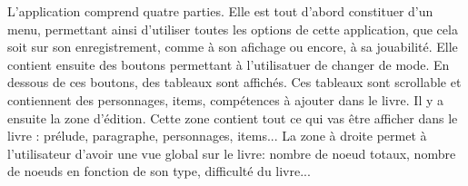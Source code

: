 		L'application comprend quatre parties. Elle est tout d'abord constituer d'un menu, permettant ainsi d'utiliser toutes les options de cette application, que cela soit sur son enregistrement, comme à son afichage ou encore, à sa jouabilité.
		Elle contient ensuite des boutons permettant à l'utilisatuer de changer de mode. En dessous de ces boutons, des tableaux sont affichés. Ces tableaux sont scrollable et contiennent des personnages, items, compétences à ajouter dans le livre.
		Il y a ensuite la zone d'édition. Cette zone contient tout ce qui vas être afficher dans le livre : prélude, paragraphe, personnages, items...
		La zone à droite permet à l'utilisateur d'avoir une vue global sur le livre: nombre de noeud totaux, nombre de noeuds en fonction de son type, difficulté du livre...

